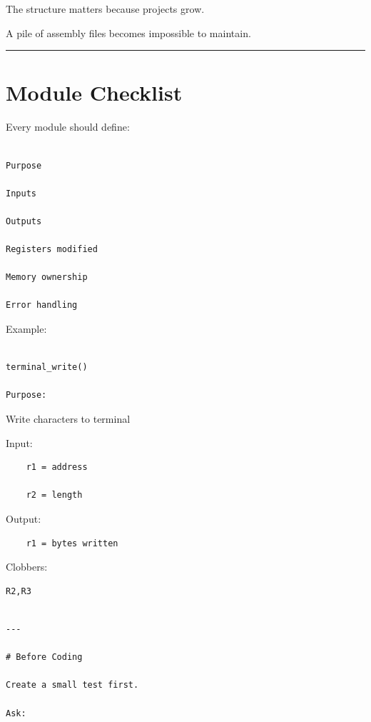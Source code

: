 \documentclass[
  oneside,
  openany]{book}
\begin{document}
The structure matters because projects grow.

A pile of assembly files becomes impossible to maintain.

\begin{center}\rule{0.5\linewidth}{0.5pt}\end{center}

\hypertarget{module-checklist}{%
\section{Module Checklist}\label{module-checklist}}

Every module should define:

\begin{verbatim}

Purpose

Inputs

Outputs

Registers modified

Memory ownership

Error handling
\end{verbatim}

Example:

\begin{verbatim}

terminal_write()

Purpose:
\end{verbatim}

Write characters to terminal


Input:

\begin{verbatim}
    r1 = address

    r2 = length
\end{verbatim}

Output:

\begin{verbatim}
    r1 = bytes written
\end{verbatim}

Clobbers:

\begin{verbatim}
R2,R3
\end{verbatim}

\begin{verbatim}

---

# Before Coding

Create a small test first.

Ask:
\end{verbatim}
\end{document}
